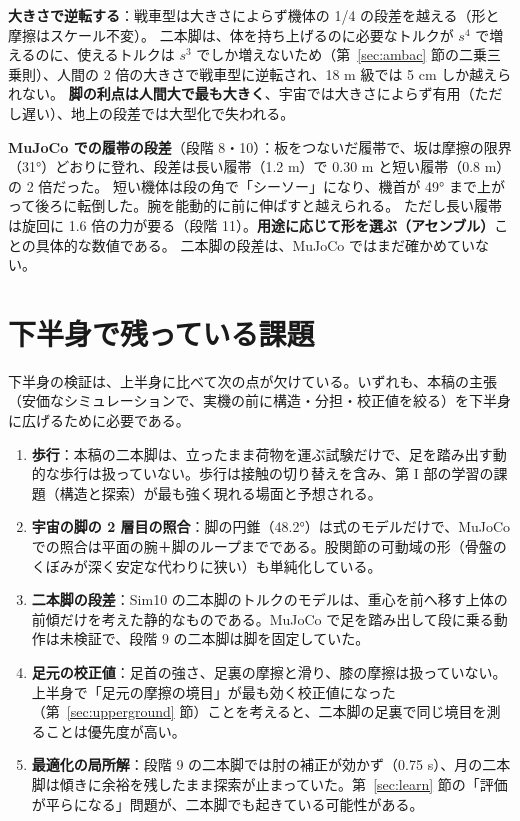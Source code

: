 \documentclass[paper=a4paper,fontsize=10pt,twocolumn,column_gap=2zw,line_length=24zw,number_of_lines=46,head_space=20mm]{jlreq}
\begin{document}
\textbf{大きさで逆転する}：戦車型は大きさによらず機体の 1/4 の段差を越える（形と摩擦はスケール不変）。
二本脚は、体を持ち上げるのに必要なトルクが $s^4$ で増えるのに、使えるトルクは $s^3$ でしか増えないため（第~\ref{sec:ambac} 節の二乗三乗則）、人間の 2 倍の大きさで戦車型に逆転され、18 m 級では 5 cm しか越えられない。
\textbf{脚の利点は人間大で最も大きく}、宇宙では大きさによらず有用（ただし遅い）、地上の段差では大型化で失われる。

\textbf{MuJoCo での履帯の段差}（段階 8・10）：板をつないだ履帯で、坂は摩擦の限界（31°）どおりに登れ、段差は長い履帯（1.2 m）で 0.30 m と短い履帯（0.8 m）の 2 倍だった。
短い機体は段の角で「シーソー」になり、機首が 49° まで上がって後ろに転倒した。腕を能動的に前に伸ばすと越えられる。
ただし長い履帯は旋回に 1.6 倍の力が要る（段階 11）。\textbf{用途に応じて形を選ぶ（アセンブル）}ことの具体的な数値である。
二本脚の段差は、MuJoCo ではまだ確かめていない。

\section{下半身で残っている課題}\label{sec:lowerrem}

下半身の検証は、上半身に比べて次の点が欠けている。いずれも、本稿の主張（安価なシミュレーションで、実機の前に構造・分担・校正値を絞る）を下半身に広げるために必要である。
\begin{enumerate}\setlength{\itemsep}{0pt}
\item \textbf{歩行}：本稿の二本脚は、立ったまま荷物を運ぶ試験だけで、足を踏み出す動的な歩行は扱っていない。歩行は接触の切り替えを含み、第 I 部の学習の課題（構造と探索）が最も強く現れる場面と予想される。
\item \textbf{宇宙の脚の 2 層目の照合}：脚の円錐（48.2°）は式のモデルだけで、MuJoCo での照合は平面の腕＋脚のループまでである。股関節の可動域の形（骨盤のくぼみが深く安定な代わりに狭い）も単純化している。
\item \textbf{二本脚の段差}：Sim10 の二本脚のトルクのモデルは、重心を前へ移す上体の前傾だけを考えた静的なものである。MuJoCo で足を踏み出して段に乗る動作は未検証で、段階 9 の二本脚は脚を固定していた。
\item \textbf{足元の校正値}：足首の強さ、足裏の摩擦と滑り、膝の摩擦は扱っていない。上半身で「足元の摩擦の境目」が最も効く校正値になった（第~\ref{sec:upperground} 節）ことを考えると、二本脚の足裏で同じ境目を測ることは優先度が高い。
\item \textbf{最適化の局所解}：段階 9 の二本脚では肘の補正が効かず（0.75 s）、月の二本脚は傾きに余裕を残したまま探索が止まっていた。第~\ref{sec:learn} 節の「評価が平らになる」問題が、二本脚でも起きている可能性がある。
\end{enumerate}
\end{document}
